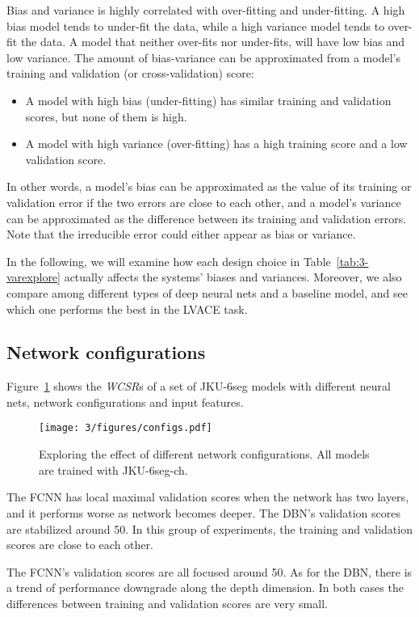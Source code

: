 Bias and variance is highly correlated with over-fitting and under-fitting. A high bias model tends to under-fit the data, while a high variance model tends to over-fit the data. A model that neither over-fits nor under-fits, will have low bias and low variance. The amount of bias-variance can be approximated from a model's training and validation (or cross-validation) score:
\begin{itemize}
	\item A model with high bias (under-fitting) has similar training and validation scores, but none of them is high.
	\item A model with high variance (over-fitting) has a high training score and a low validation score.
\end{itemize}
In other words, a model's bias can be approximated as the value of its training or validation error if the two errors are close to each other, and a model's variance can be approximated as the difference between its training and validation errors. Note that the irreducible error could either appear as bias or variance.

In the following, we will examine how each design choice in Table~\ref{tab:3-varexplore} actually affects the systems' biases and variances. Moreover, we also compare among different types of deep neural nets and a baseline model, and see which one performs the best in the LVACE task.

\subsection{Network configurations} \label{sec:3-p2}

Figure~\ref{fig:3-configs} shows the \textit{WCSR}s of a set of JKU-6seg models with different neural nets, network configurations and input features.
\begin{figure}[h!]
	\centering
	\texttt{[image: 3/figures/configs.pdf]}
	\caption{Exploring the effect of different network configurations. All models are trained with JKU-6seg-ch.}
	\label{fig:3-configs}
\end{figure}
The FCNN has local maximal validation scores when the network has two layers, and it performs worse as  network becomes deeper. The DBN's validation scores are stabilized around 50. In this group of experiments, the training and validation scores are close to each other.

The FCNN's validation scores are all focused around 50. As for the DBN, there is a trend of performance downgrade along the depth dimension. In both cases the differences between training and validation scores are very small.

